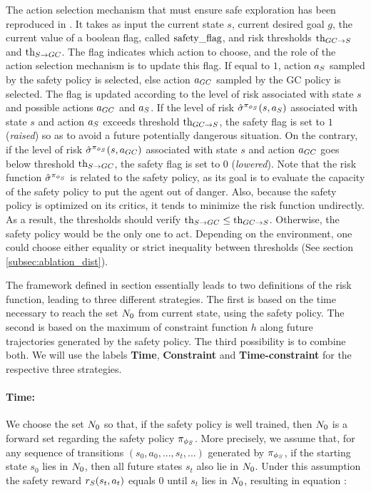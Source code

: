 The action selection mechanism that must ensure safe exploration has been reproduced in .
It takes as input the current state $s$, current desired goal $g$, the current value of a boolean flag, called $\text{safety}\_\text{flag}$, and 
risk thresholds $\text{th}_{GC \rightarrow S}$ and $\text{th}_{S \rightarrow GC}$. The flag indicates which action to choose, and the role of the action selection mechanism is to update this flag. If equal to $1$, action $a_S$ 
sampled by the safety policy is selected, else action $a_{GC}$ sampled by the GC policy is selected.
The flag is updated according to the level of risk associated  
with state $s$ and possible actions $a_{GC}$ and $a_S$. If the level of risk $\hat{\sigma}^{\pi_{\phi_S}}(s, a_S)$ 
associated with state $s$ and action $a_S$ exceeds threshold $\text{th}_{GC \rightarrow S}$, the safety flag is set to $1$ (\textit{raised})
so as to avoid a future potentially dangerous situation. On the contrary, if the level of risk $\hat{\sigma}^{\pi_{\phi_S}}(s, a_{GC})$ 
associated with state $s$ and action $a_{GC}$ goes below threshold $\text{th}_{S \rightarrow GC}$, the safety flag is set to $0$ (\textit{lowered}).
Note that the risk function $\hat{\sigma}^{\pi_{\phi_S}}$ is related to the safety policy, as its goal is to evaluate the capacity 
of the safety policy to put the agent out of danger. 
Also, because the safety policy is optimized on its critics, it tends to minimize the risk function undirectly. As a result, 
the thresholds should verify $\text{th}_{S \rightarrow GC} \le \text{th}_{GC \rightarrow S}$. Otherwise, the safety policy would be the only one to act.
Depending on the environment, one could choose either equality or strict inequality between thresholds 
(See section \ref{subsec:ablation_dist}). 

The framework defined in section  essentially leads to two 
definitions of the risk function, leading to three different strategies. 
The first is based on the time necessary to reach the set $N_0$ from current state, using the safety policy. 
The second is based on the maximum of constraint function $h$ along future trajectories generated by the safety policy.
The third possibility is to combine both. We will use the labels \textbf{Time}, \textbf{Constraint} and \textbf{Time-constraint}
for the respective three strategies. 

\paragraph{\textbf{Time:}} We choose the set $N_0$ so that, if the safety policy is well trained, 
then $N_0$ is a forward set regarding the safety policy $\pi_{\phi_S}$. More precisely, we assume that, 
for any sequence of transitions $(s_0, a_0, ..., s_t, ...)$ generated by $\pi_{\phi_S}$, if 
the starting state $s_0$ lies in $N_0$, then all future states $s_t$ also lie in $N_0$.
Under this assumption the safety reward $r_S(s_t, a_t)$ equals $0$ until $s_t$ lies in $N_0$, resulting in equation 
:

